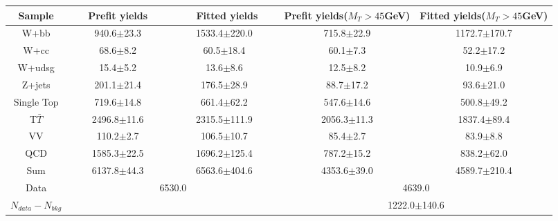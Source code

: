  \begin{adjustbox}{width=1.\textwidth,center=\textwidth}
   \begin{tabular} {c|cc|cc} \hline\hline
			 Sample & ~~~Prefit yields~~~ & ~~~~Fitted yields~~~ & Prefit yields($M_T>45$GeV) & Fitted yields($M_T>45$GeV) \\ 
 \hline
W+bb&940.6$\pm$23.3&1533.4$\pm$220.0&715.8$\pm$22.9&1172.7$\pm$170.7\\
W+cc&68.6$\pm$8.2&60.5$\pm$18.4&60.1$\pm$7.3&52.2$\pm$17.2\\
W+udsg&15.4$\pm$5.2&13.6$\pm$8.6&12.5$\pm$8.2&10.9$\pm$6.9\\
Z+jets&201.1$\pm$21.4&176.5$\pm$28.9&88.7$\pm$17.2&93.6$\pm$21.0\\
Single Top&719.6$\pm$14.8&661.4$\pm$62.2&547.6$\pm$14.6&500.8$\pm$49.2\\
T$\bar{T}$&2496.8$\pm$11.6&2315.5$\pm$111.9&2056.3$\pm$11.3&1837.4$\pm$89.4\\
VV&110.2$\pm$2.7&106.5$\pm$10.7&85.4$\pm$2.7&83.9$\pm$8.8\\
QCD&1585.3$\pm$22.5&1696.2$\pm$125.4&787.2$\pm$15.2&838.2$\pm$62.0\\
\hline
Sum &6137.8$\pm$44.3&6563.6$\pm$404.6&4353.6$\pm$39.0&4589.7$\pm$210.4\\
\hline
Data&\multicolumn{2}{c}{6530.0}&\multicolumn{2}{c}{4639.0}\\
   \hline
$N_{data}-N_{bkg}$&\multicolumn{2}{c}{}&\multicolumn{2}{c}{1222.0$\pm$140.6}\\
   \hline\hline
   \end{tabular}
 \end{adjustbox}
